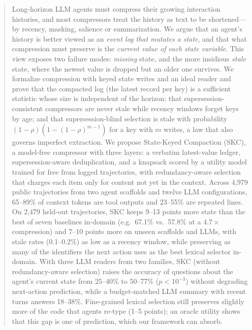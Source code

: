 \begin{abstract}
Long-horizon LLM agents must compress their growing interaction histories, and
most compressors treat the history as text to be shortened---by recency,
masking, salience or summarization. We argue that an agent's history is better
viewed as an \emph{event log that mutates a state}, and that what compression
must preserve is the \emph{current value of each state variable}. This view
exposes two failure modes: \emph{missing} state, and the more insidious
\emph{stale} state, where the newest value is dropped but an older one survives.
We formalize compression with keyed state writes and an ideal reader and prove
that the compacted log (the latest record per key) is a sufficient statistic
whose size is independent of the horizon; that supersession-consistent
compressors are never stale while recency windows forget keys by age; and that
supersession-blind selection is stale with probability
$(1-\rho)(1-(1-\rho)^{m-1})$ for a key with $m$ writes, a law that also governs
imperfect extraction. We propose State-Keyed Compaction (SKC), a model-free
compressor with three layers: a verbatim latest-value ledger, supersession-aware
deduplication, and a knapsack scored by a utility model trained for free from
logged trajectories, with redundancy-aware selection that charges each item only
for content not yet in the context. Across 4{,}979 public trajectories from two
agent scaffolds and twelve LLM configurations, 65--89\% of context tokens are
tool outputs and 23--55\% are repeated lines. On 2{,}479 held-out trajectories,
SKC keeps 9--13 points more state than the best of seven baselines in-domain
(e.g.\ 67.1\% vs.\ 57.8\% at a $4.7\times$ compression) and 7--10 points more on
unseen scaffolds and LLMs, with stale rates (0.1--0.2\%) as low as a recency
window, while preserving as many of the identifiers the next action uses as the
best lexical selector in-domain. With three LLM readers from two families, SKC (without redundancy-aware selection) raises the accuracy of
questions about the agent's current state from 25--40\% to 50--77\%
($p<10^{-3}$) without degrading next-action prediction, while a budget-matched
LLM summary with recent turns answers 18--38\%. Fine-grained lexical selection
still preserves slightly more of the code that agents re-type (1--5 points);
an oracle utility shows that this gap is one of prediction, which our framework
can absorb.
\end{abstract}

